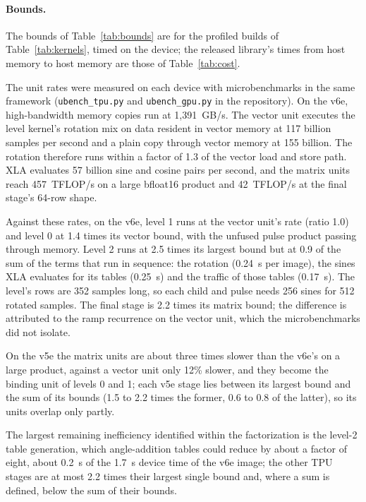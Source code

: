 \documentclass[11pt]{article}
\begin{document}
\paragraph{Bounds.} The bounds of Table~\ref{tab:bounds} are for the profiled builds of Table~\ref{tab:kernels}, timed on the device; the released library's times from host memory to host memory are those of Table~\ref{tab:cost}.

The unit rates were measured on each device with microbenchmarks in the same framework (\texttt{ubench\_tpu.py} and \texttt{ubench\_gpu.py} in the repository). On the v6e, high-bandwidth memory copies run at 1,391~GB/s. The vector unit executes the level kernel's rotation mix on data resident in vector memory at 117 billion samples per second and a plain copy through vector memory at 155 billion. The rotation therefore runs within a factor of 1.3 of the vector load and store path. XLA evaluates 57 billion sine and cosine pairs per second, and the matrix units reach 457~TFLOP/s on a large bfloat16 product and 42~TFLOP/s at the final stage's 64-row shape.

Against these rates, on the v6e, level 1 runs at the vector unit's rate (ratio 1.0) and level 0 at 1.4 times its vector bound, with the unfused pulse product passing through memory. Level 2 runs at 2.5 times its largest bound but at 0.9 of the sum of the terms that run in sequence: the rotation (0.24~s per image), the sines XLA evaluates for its tables (0.25~s) and the traffic of those tables (0.17~s). The level's rows are 352 samples long, so each child and pulse needs 256 sines for 512 rotated samples. The final stage is 2.2 times its matrix bound; the difference is attributed to the ramp recurrence on the vector unit, which the microbenchmarks did not isolate.

On the v5e the matrix units are about three times slower than the v6e's on a large product, against a vector unit only 12\% slower, and they become the binding unit of levels 0 and 1; each v5e stage lies between its largest bound and the sum of its bounds (1.5 to 2.2 times the former, 0.6 to 0.8 of the latter), so its units overlap only partly.

The largest remaining inefficiency identified within the factorization is the level-2 table generation, which angle-addition tables could reduce by about a factor of eight, about 0.2~s of the 1.7~s device time of the v6e image; the other TPU stages are at most 2.2 times their largest single bound and, where a sum is defined, below the sum of their bounds.
\end{document}
